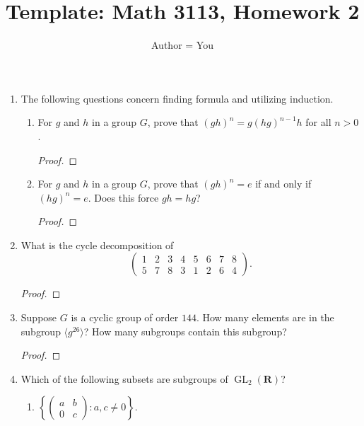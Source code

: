 \documentclass[oneside,11pt]{amsart}
\title{Template: Math 3113, Homework 2}
\author{ Author = You}
\newcommand{\RR}{\mathbf R}
\newcommand{\GL}{\operatorname{GL}}
\theoremstyle{Theorem}
\theoremstyle{definition}
\begin{document}
\maketitle

\vspace{-5mm}




\begin{enumerate}

\item The following questions concern finding formula and utilizing induction. 
\begin{enumerate}
\item For $g$ and $h$ in a group $G$, prove that $(gh)^n = g (hg)^{n-1} h$ for all $n > 0$. 
\begin{proof}

\end{proof}
\item For $g$ and $h$ in a group $G$, prove that $(gh)^n = e$ if and only if $(hg)^n = e$. Does this force $gh = hg$? 
\begin{proof}

\end{proof}

\end{enumerate}

\newpage


\item What is the cycle decomposition of $$ \left( \begin{matrix} 1 & 2 & 3 & 4 & 5 & 6 & 7 & 8 \\ 5 & 7 & 8 & 3 & 1 & 2 & 6 & 4 \end{matrix} \right) .$$

\begin{proof}

\end{proof}


\newpage


\item  Suppose $G$ is a cyclic group of order $144$. How many elements are in the subgroup $\langle g^{26} \rangle$? How many subgroups contain this subgroup? 

\begin{proof}

\end{proof}

\newpage

\item Which of the following subsets are subgroups of $\GL_2(\RR)$?
\begin{enumerate}
\item $\left \{ \left( \begin{smallmatrix} a & b \\ 0 & c \end{smallmatrix} \right) \colon a, c \neq 0 \right \}.$


\end{enumerate}
\end{enumerate}
\end{document}
